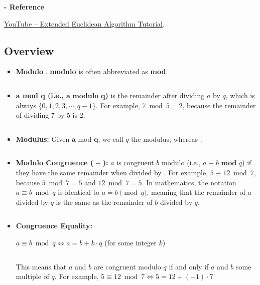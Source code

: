 
\noindent \textbf{- Reference} 

\href{https://www.youtube.com/watch?v=fz1vxq5ts5I}{YouTube -- Extended Euclidean Algorithm Tutorial}.


\subsection{Overview}
\label{subsec:modulo-overview} 

\begin{tcolorbox}[title={\textbf{\tboxdef{\ref*{subsec:modulo-overview}} Integer Modulo}}]

\begin{itemize}

\item \textbf{Modulo} . \textbf{modulo} is often abbreviated as \textbf{mod}.

$ $

\item \textbf{$\bm{a}$ mod $\bm{q}$ (i.e., $\bm{a} \bm{\text{ modulo } q}$)} is the remainder after dividing $a$ by $q$, which is always  $\{0, 1, 2, 3, \cdots, q-1\}$. For example, $7 \bmod 5 = 2$, because the remainder of dividing 7 by 5 is 2. 

$ $

\item \textbf{Modulus:} Given $\bm{a}$ mod $\bm{q}$, we call  $q$ the modulus, whereas .

$ $

\item \textbf{Modulo Congruence ($\bm{\equiv}$):} $a$ is congruent  $b$ modulo  (i.e., $a \equiv b \textbf{ mod } q$) if they have the same remainder when divided by . For example, $5 \equiv 12 \bmod 7$, because $5 \bmod 7 = 5$ and $12 \bmod 7 = 5$. In mathematics, the notation $a \equiv b \bmod q$ is identical to $a = b \pmod q$, meaning that the remainder of $a$ divided by $q$ is the same as the remainder of $b$ divided by $q$. 

$ $

\item \textbf{Congruence \textit{} Equality:} 

$a \equiv b \bmod q \Longleftrightarrow a = b + k\cdot q$ \text{ } (for some integer $k$)

$ $

This means that $a$ and $b$ are congruent modulo $q$ if and only if $a$ and $b$  some multiple of $q$. For example, $5 \equiv 12 \bmod 7 \Longleftrightarrow 5 = 12 + (-1)\cdot 7$

\end{itemize}

\end{tcolorbox}


